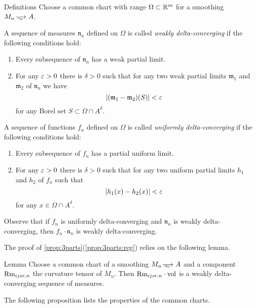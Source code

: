\begin{thm}{Definitions}\label{def:delta-converge}
Choose a common chart with range $\Omega\subset \mathbb{R}^m$ for a smoothing $M_n\smooths{} A$.

A sequence of measures $\mathfrak n_n$ defined on $\Omega$ is called \emph{weakly delta-converging}
if the following conditions hold:
\begin{enumerate}
 \item Every subsequence of $\mathfrak n_n$ has a weak partial limit.
 \item For any $\varepsilon>0$ there is $\delta>0$ such that for any two weak partial limits $\mathfrak m_1$ and $\mathfrak m_2$ of $\mathfrak n_n$ we have  
\[|(\mathfrak m_1-\mathfrak m_2)(S)|<\varepsilon\]
for any Borel set $S\subset \Omega\cap A^\delta$.
\end{enumerate}

A sequence of functions $f_n$ defined on $\Omega$ is called \emph{uniformly delta-converging}
if the following conditions hold:
\begin{enumerate}
 \item Every subsequence of $f_n$ has a partial uniform limit.
 \item For any $\varepsilon>0$ there is $\delta>0$ such that for any two uniform partial limits $h_1$ and $h_2$ of $f_n$  such that 
\[|h_1(x)-h_2(x)|<  \varepsilon\]
for any $x\in \Omega\cap A^\delta$.
\end{enumerate}

\end{thm}

Observe that if $f_n$ is uniformly delta-converging and $\mathfrak n_n$ is weakly delta-converging,
then $f_n\cdot \mathfrak n_n$ is weakly delta-converging.

The proof of \ref{prop:3parts}(\ref{prop:3parts:reg}) relies on the following lemma.

\begin{thm}{Lemma}\label{A^0}
Choose a common chart of a smoothing $M_n\smooths{} A$ and a component $\operatorname{\rm Rm}_{ijsr,n}$ the curvature tensor of $M_n$.
Then $\Rm_{ijsr,n}\cdot \vol$ is a weakly  delta-converging sequence of measures.
\end{thm}

The following proposition lists the properties of the common charts.

